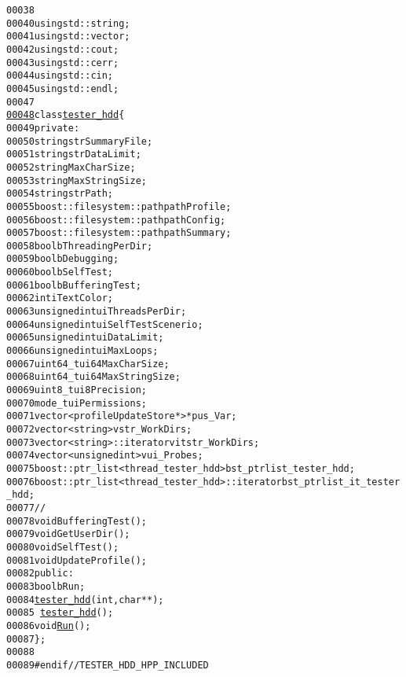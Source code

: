 \begin{footnotesize}
\begin{alltt}
00038 \textcolor{preprocessor}{}
00040 \textcolor{keyword}{using} std::string;
00041 \textcolor{keyword}{using} std::vector;
00042 \textcolor{keyword}{using} std::cout;
00043 \textcolor{keyword}{using} std::cerr;
00044 \textcolor{keyword}{using} std::cin;
00045 \textcolor{keyword}{using} std::endl;
00047 
\hypertarget{tester__hdd_8hpp_source_l00048}{}\hyperlink{classtester__hdd}{00048} \textcolor{keyword}{class }\hyperlink{classtester__hdd}{tester_hdd}\{
00049     \textcolor{keyword}{private}:
00050         \textcolor{keywordtype}{string} strSummaryFile; 
00051         \textcolor{keywordtype}{string} strDataLimit; 
00052         \textcolor{keywordtype}{string} MaxCharSize; 
00053         \textcolor{keywordtype}{string} MaxStringSize; 
00054         \textcolor{keywordtype}{string} strPath;
00055         boost::filesystem::path pathProfile;
00056         boost::filesystem::path pathConfig;
00057         boost::filesystem::path pathSummary;
00058         \textcolor{keywordtype}{bool} bThreadingPerDir; 
00059         \textcolor{keywordtype}{bool} bDebugging; 
00060         \textcolor{keywordtype}{bool} bSelfTest;
00061         \textcolor{keywordtype}{bool} bBufferingTest;
00062         \textcolor{keywordtype}{int} iTextColor;
00063         \textcolor{keywordtype}{unsigned} \textcolor{keywordtype}{int} uiThreadsPerDir; 
00064         \textcolor{keywordtype}{unsigned} \textcolor{keywordtype}{int} uiSelfTestScenerio; 
00065         \textcolor{keywordtype}{unsigned} \textcolor{keywordtype}{int} uiDataLimit; 
00066         \textcolor{keywordtype}{unsigned} \textcolor{keywordtype}{int} uiMaxLoops;
00067         uint64\_t ui64MaxCharSize;
00068         uint64\_t ui64MaxStringSize;
00069         uint8\_t ui8Precision;
00070         mode\_t uiPermissions; 
00071         vector<profileUpdateStore*> *pus\_Var;
00072         vector<string> vstr\_WorkDirs; 
00073         vector<string>::iterator vitstr\_WorkDirs; 
00074         vector<unsigned int> vui\_Probes;
00075         boost::ptr\_list<thread\_tester\_hdd> bst\_ptrlist\_tester\_hdd; 
00076         boost::ptr\_list<thread\_tester\_hdd>::iterator bst\_ptrlist\_it\_tester\_hdd; 
00077         \textcolor{comment}{//}
00078         \textcolor{keywordtype}{void} BufferingTest();
00079         \textcolor{keywordtype}{void} GetUserDir();
00080         \textcolor{keywordtype}{void} SelfTest();
00081         \textcolor{keywordtype}{void} UpdateProfile();
00082     \textcolor{keyword}{public}:
00083         \textcolor{keywordtype}{bool} bRun;
00084         \hyperlink{classtester__hdd_af43b8ca9595ed8ebf14b2c7cffe561c2}{tester_hdd}(\textcolor{keywordtype}{int},\textcolor{keywordtype}{char} **);
00085         ~\hyperlink{classtester__hdd}{tester_hdd}();
00086         \textcolor{keywordtype}{void} \hyperlink{classtester__hdd_abfdcc395e8be504dfd0ea686da790375}{Run}();
00087 \};
00088 
00089 \textcolor{preprocessor}{#endif // TESTER\_HDD\_HPP\_INCLUDED}
\end{alltt}\end{footnotesize}
